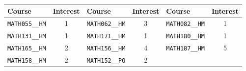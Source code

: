 \begin{tabular}{|p{}|c||p{}|c||p{}|c|}
    \hline
    Course & Interest & Course & Interest & Course & Interest\\\hline
    \verb|MATH055__HM| & 1&
    \verb|MATH062__HM| & 3&
    \verb|MATH082__HM| & 1\\
    \verb|MATH131__HM| & 1&
    \verb|MATH171__HM| & 1&
    \verb|MATH180__HM| & 1\\
    \verb|MATH165__HM| & 2&
    \verb|MATH156__HM| & 4&
    \verb|MATH187__HM| & 5\\
    \verb|MATH158__HM| & 2&
    \verb|MATH152__PO| & 2&&\\
    \hline
\end{tabular}